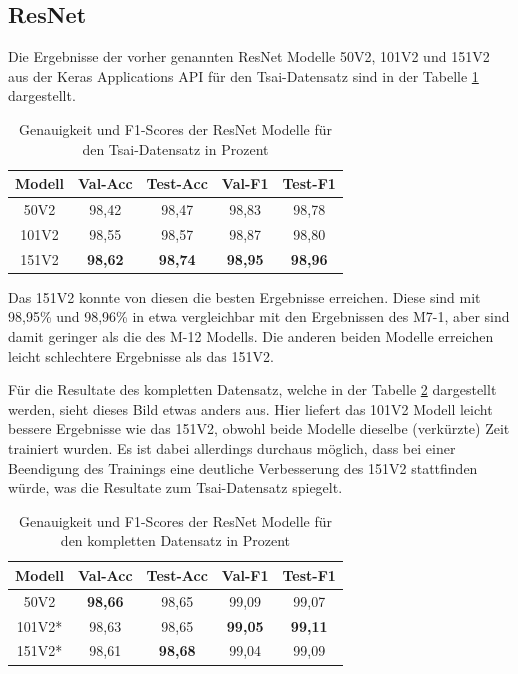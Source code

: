 \documentclass[twoside,a4paper]{IEEEtran}
\begin{document}
\subsection{ResNet}

Die Ergebnisse der vorher genannten ResNet Modelle 50V2, 101V2 und 151V2 aus der Keras Applications API für den Tsai-Datensatz sind in der Tabelle \ref{resnet_ergebnis_tsai} dargestellt.
\begin{table}[!htb]
	\caption{Genauigkeit und F1-Scores der ResNet Modelle für den Tsai-Datensatz in Prozent}
	\label{resnet_ergebnis_tsai}
	\centering
	\begin{tabular}{|c|c|c|c|c|}
		\hline
		Modell & Val-Acc & Test-Acc & Val-F1 & Test-F1\\
		\hline
		\hline
	 	50V2 & 98,42 & 98,47 & 98,83 & 98,78\\
		\hline
		101V2 & 98,55 & 98,57 & 98,87 & 98,80\\
		\hline
		151V2 & \textbf{98,62} & \textbf{98,74} & \textbf{98,95} & \textbf{98,96}\\
		\hline 
	\end{tabular}
\end{table} 
Das 151V2 konnte von diesen die besten Ergebnisse erreichen. Diese sind mit 98,95\% und 98,96\% in etwa vergleichbar mit den Ergebnissen des M7-1, aber sind damit geringer als die des M-12 Modells. Die anderen beiden Modelle erreichen leicht schlechtere Ergebnisse als das 151V2. 

Für die Resultate des kompletten Datensatz, welche in der Tabelle \ref{resnet_ergebnis_full} dargestellt werden, sieht dieses Bild etwas anders aus. Hier liefert das 101V2 Modell leicht bessere Ergebnisse wie das 151V2, obwohl beide Modelle dieselbe (verkürzte) Zeit trainiert wurden. Es ist dabei allerdings durchaus möglich, dass bei einer Beendigung des Trainings eine deutliche Verbesserung des 151V2 stattfinden würde, was die Resultate zum Tsai-Datensatz spiegelt.
\begin{table}[!htb]
	\caption{Genauigkeit und F1-Scores der ResNet Modelle für den kompletten Datensatz in Prozent}
	\label{resnet_ergebnis_full}
	\centering
	\begin{tabular}{|c|c|c|c|c|}
		\hline
		Modell & Val-Acc & Test-Acc & Val-F1 & Test-F1\\
		\hline
		\hline 
		50V2 & \textbf{98,66} & 98,65 & 99,09 & 99,07\\
		\hline
		101V2* & 98,63 & 98,65 & \textbf{99,05} & \textbf{99,11}\\
		\hline
		151V2* & 98,61 & \textbf{98,68} & 99,04 & 99,09\\
		\hline 
	\end{tabular}
\end{table}
\end{document}
